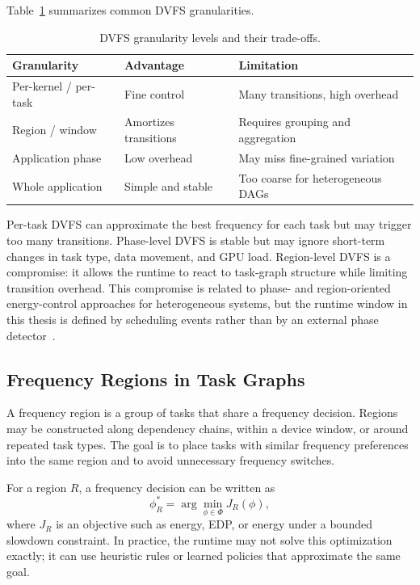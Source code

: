 Table~\ref{tab:dvfs_granularity} summarizes common DVFS granularities.

\begin{table}[!htbp]
\centering
\footnotesize
\begin{tabular}{@{}lll@{}}
\toprule
Granularity & Advantage & Limitation \\
\midrule
Per-kernel / per-task & Fine control & Many transitions, high overhead \\
Region / window & Amortizes transitions & Requires grouping and aggregation \\
Application phase & Low overhead & May miss fine-grained variation \\
Whole application & Simple and stable & Too coarse for heterogeneous DAGs \\
\bottomrule
\end{tabular}
\caption{DVFS granularity levels and their trade-offs.}
\label{tab:dvfs_granularity}
\end{table}

Per-task DVFS can approximate the best frequency for each task but may trigger too many transitions. Phase-level DVFS is stable but may ignore short-term changes in task type, data movement, and GPU load. Region-level DVFS is a compromise: it allows the runtime to react to task-graph structure while limiting transition overhead. This compromise is related to phase- and region-oriented energy-control approaches for heterogeneous systems, but the runtime window in this thesis is defined by \CUDASTF{} scheduling events rather than by an external phase detector~\cite{Fan2023Synergy,Carpentieri2025Phase}.

\subsection{Frequency Regions in Task Graphs}
\label{subsec:frequency_regions}

A frequency region is a group of tasks that share a frequency decision. Regions may be constructed along dependency chains, within a device window, or around repeated task types. The goal is to place tasks with similar frequency preferences into the same region and to avoid unnecessary frequency switches.

For a region $R$, a frequency decision can be written as
\begin{equation}
\phi_R^{*} = \arg\min_{\phi \in \Phi} J_R(\phi),
\label{eq:region_frequency_decision}
\end{equation}
where $J_R$ is an objective such as energy, EDP, or energy under a bounded slowdown constraint. In practice, the runtime may not solve this optimization exactly; it can use heuristic rules or learned policies that approximate the same goal.

